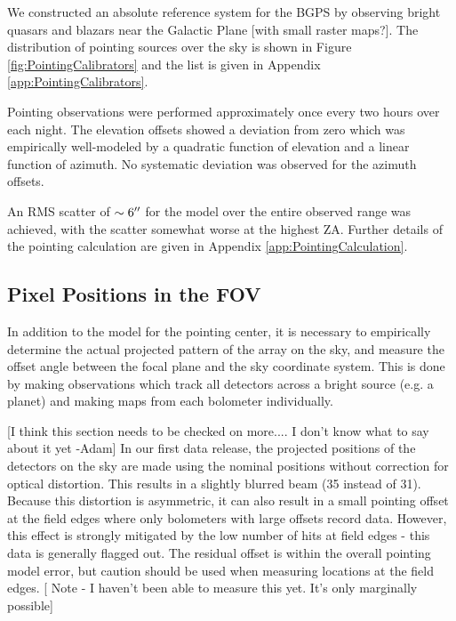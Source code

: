 \documentclass[12pt,preprint]{aastex}
\begin{document}
We constructed an absolute reference system for the BGPS by observing
bright quasars and blazars near the Galactic Plane [with small raster maps?].  The distribution
of pointing sources over the sky is shown in Figure
\ref{fig:PointingCalibrators} and the list is given in Appendix
\ref{app:PointingCalibrators}.

Pointing observations were performed approximately once every two
hours over each night.   The
elevation offsets showed a deviation from zero which was empirically
well-modeled by a quadratic function of elevation and a linear
function of azimuth.  No systematic deviation was observed for the
azimuth offsets.  

An RMS scatter of $\sim 6\mbox{$^{\prime\prime}$}$ for the model over the
entire observed range was achieved, with the scatter somewhat worse at the
highest ZA.  
Further details of the pointing calculation are given in Appendix
\ref{app:PointingCalculation}.

\subsection{Pixel Positions in the FOV}

In addition to the model for the pointing center, it is necessary to
empirically determine the actual projected pattern of the array on the
sky, and measure the offset angle between the focal plane and the sky
coordinate system.  This is done by making observations which track
all detectors across a bright source (e.g. a planet) and making maps from each
bolometer individually. 

[I think this section needs to be checked on more.... I don't know what to say about it yet -Adam]
In our first data release, the projected positions of the detectors on the sky
are made using the nominal positions without correction for optical distortion.
This results in a slightly blurred beam (35 instead of 31).
Because this distortion is asymmetric, it can also result in a small pointing
offset at the field edges where only bolometers with large offsets record data.
However, this effect is strongly mitigated by the low number of hits at field
edges - this data is generally flagged out.  The residual offset is within the
overall pointing model error, but caution should be used when measuring
locations at the field edges. [ Note - I haven't been able to measure this yet.  It's only marginally
possible]
\end{document}
